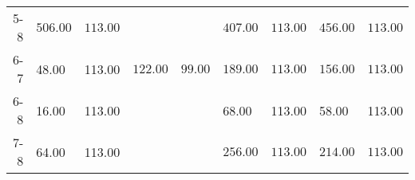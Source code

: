 \begin{table}[ht]
\begin{tabular}{rllllllll}
  5-8 & \(\mathbf{506.00}\) & \(\mathbf{113.00}\) &  &  & \(\mathbf{407.00}\) & \(\mathbf{113.00}\) & \(\mathbf{456.00}\) & \(\mathbf{113.00}\) \\ 
  6-7 & 48.00 & 113.00 & \(\mathbf{122.00}\) & \(\mathbf{99.00}\) & \(\mathbf{189.00}\) & \(\mathbf{113.00}\) & \(\mathbf{156.00}\) & \(\mathbf{113.00}\) \\ 
  6-8 & 16.00 & 113.00 &  &  & 68.00 & 113.00 & 58.00 & 113.00 \\ 
  7-8 & 64.00 & 113.00 &  &  & \(\mathbf{256.00}\) & \(\mathbf{113.00}\) & \(\mathbf{214.00}\) & \(\mathbf{113.00}\) \\ 
   \bottomrule
\end{tabular}
\end{table}
